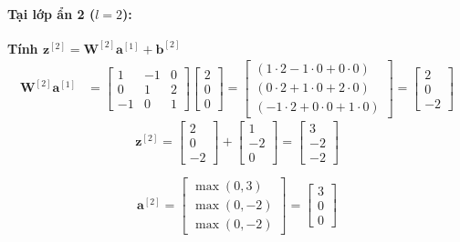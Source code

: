 \paragraph{Tại lớp ẩn 2 ($l=2$):\\}
\textbf{Tính $\mathbf{z}^{[2]} = \mathbf{W}^{[2]}\mathbf{a}^{[1]} + \mathbf{b}^{[2]}$}
\begin{align*}
\mathbf{W}^{[2]}\mathbf{a}^{[1]} 
&= 
\begin{bmatrix}
    1 & -1 & 0 \\
    0 & 1 & 2 \\
    -1 & 0 & 1
\end{bmatrix}
\begin{bmatrix}
    2 \\ 0 \\ 0
\end{bmatrix}
=
\begin{bmatrix}
    (1\cdot 2 - 1\cdot 0 + 0\cdot 0) \\
    (0\cdot 2 + 1\cdot 0 + 2\cdot 0) \\
    (-1\cdot 2 + 0\cdot 0 + 1\cdot 0)
\end{bmatrix}
=
\begin{bmatrix}
    2 \\ 0 \\ -2
\end{bmatrix}
\end{align*}
\begin{equation}
\mathbf{z}^{[2]} = 
\begin{bmatrix}
    2 \\ 0 \\ -2
\end{bmatrix}
+
\begin{bmatrix}
    1 \\ -2 \\ 0
\end{bmatrix}
=
\begin{bmatrix}
    3 \\ -2 \\ -2
\end{bmatrix}
\end{equation}

\begin{equation}
\mathbf{a}^{[2]} = 
\begin{bmatrix}
    \max(0, 3) \\
    \max(0, -2) \\
    \max(0, -2)
\end{bmatrix}
=
\begin{bmatrix}
    3 \\ 0 \\ 0
\end{bmatrix}
\end{equation}

